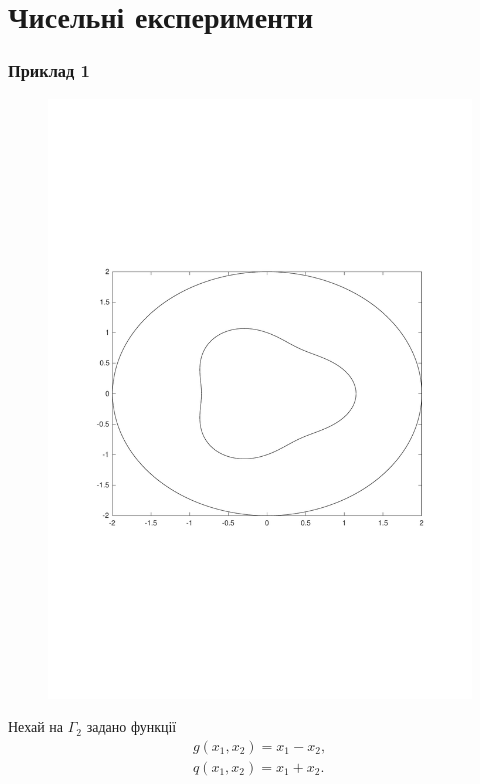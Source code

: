 \documentclass[10pt]{beamer}
\begin{document}
 \section{Чисельні експерименти}
\begin{frame}
\frametitle{Приклад 1}

 \begin{figure}[h!]
\centering
	\vspace*{-2.4cm}
	\includegraphics[scale=.3]{sample1.pdf}
	\vspace*{-2.5cm}
\end{figure}

Нехай на $\Gamma_2$ задано функції
  \begin{gather*}
	g(x_1, x_2) = x_1-x_2,\\
	q(x_1, x_2) = x_1 +x_2.
 \end{gather*}

\end{frame}
\end{document}
